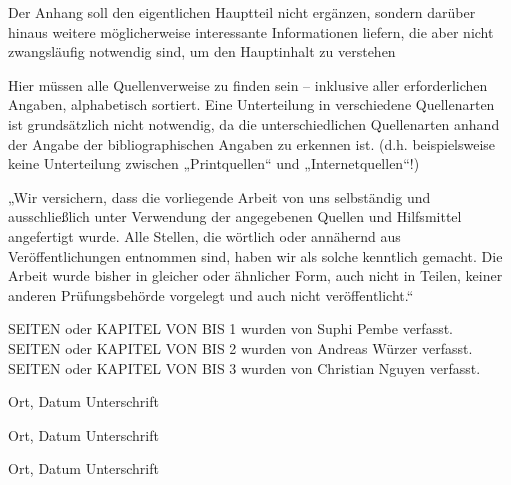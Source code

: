 \documentclass[12pt,toc=bib,toc=listof]{scrreprt}
\newcommand{\studentnameA}{Suphi Pembe}
\newcommand{\studentpartA}{SEITEN oder KAPITEL VON BIS 1}
\newcommand{\studentnameB}{Andreas Würzer}
\newcommand{\studentpartB}{SEITEN oder KAPITEL VON BIS 2}
\newcommand{\studentnameC}{Christian Nguyen}
\newcommand{\studentpartC}{SEITEN oder KAPITEL VON BIS 3}
\newcounter{savepage}
\begin{document}

\appendix
\newpage

\setcounter{page}{\thesavepage}

\label{sec:anhang}

Der Anhang soll den eigentlichen Hauptteil nicht ergänzen, sondern darüber hinaus weitere möglicherweise interessante Informationen liefern, die aber nicht zwangsläufig notwendig sind, um den Hauptinhalt zu verstehen

\newpage

\printbibliography[heading=head]

\vspace{2cm}

Hier müssen alle Quellenverweise zu finden sein – inklusive aller erforderlichen Angaben, alphabetisch sortiert. Eine Unterteilung in verschiedene Quellenarten ist grundsätzlich nicht notwendig, da die unterschiedlichen Quellenarten anhand der Angabe der bibliographischen Angaben zu erkennen ist. (d.h. beispielsweise keine Unterteilung zwischen „Printquellen“ und „Internetquellen“!)

\newpage

\label{sec:erklaerung}

„Wir versichern, dass die vorliegende Arbeit von uns selbständig und ausschließlich unter Verwendung der angegebenen Quellen und Hilfsmittel angefertigt wurde. Alle Stellen, die wörtlich oder annähernd aus Veröffentlichungen entnommen sind, haben wir als solche kenntlich gemacht. Die Arbeit wurde bisher in gleicher oder ähnlicher Form, auch nicht in Teilen, keiner anderen Prüfungsbehörde vorgelegt und auch nicht veröffentlicht.“

\vspace{1cm}
\noindent
{\studentpartA} wurden von {\studentnameA} verfasst.
\\
{\studentpartB} wurden von {\studentnameB} verfasst.
\\
{\studentpartC} wurden von {\studentnameC} verfasst.

\vspace{3cm}
Ort, Datum \hfill Unterschrift

\vspace{2cm}
Ort, Datum \hfill Unterschrift

\vspace{2cm}
Ort, Datum \hfill Unterschrift
\end{document}
